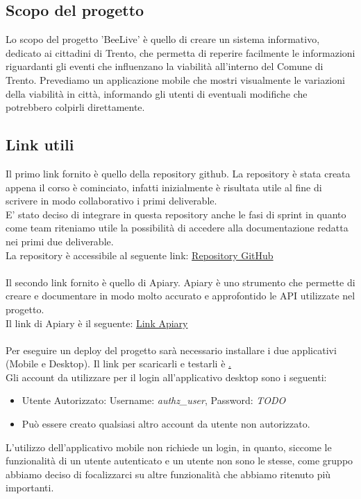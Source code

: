\documentclass{article}
\begin{document}
\subsection{Scopo del progetto}

Lo scopo del progetto 'BeeLive' è quello di creare un sistema informativo, dedicato ai cittadini di Trento, che permetta di reperire facilmente le informazioni riguardanti gli eventi che influenzano la viabilità all'interno del Comune di Trento. Prevediamo un applicazione mobile che mostri visualmente le variazioni della viabilità in città, informando gli utenti di eventuali modifiche che potrebbero colpirli direttamente. 

\subsection{Link utili}
Il primo link fornito è quello della repository github. La repository è stata creata appena il corso è cominciato, infatti inizialmente è risultata utile al fine di scrivere in modo collaborativo i primi deliverable.\\
E' stato deciso di integrare in questa repository anche le fasi di sprint in quanto come team riteniamo utile la possibilità di accedere alla documentazione redatta nei primi due deliverable.\\
La repository è accessibile al seguente link: \href{https://github.com/ELI20ZIVI/BeeLive/}{Repository GitHub}\\ \\
Il secondo link fornito è quello di Apiary. Apiary è uno strumento che permette di creare e documentare in modo molto accurato e approfontido le API utilizzate nel progetto.\\
Il link di Apiary è il seguente: \href{https://beelive.docs.apiary.io/#}{Link Apiary}\\ \\
Per eseguire un deploy del progetto sarà necessario installare i due applicativi (Mobile e Desktop). Il link per scaricarli e testarli è \href{github-release-page}.\\
Gli account da utilizzare per il login all'applicativo desktop sono i seguenti:
\begin{itemize}
    \item Utente Autorizzato: Username: \textit{authz\_user}, Password: \textit{TODO}
    \item Può essere creato qualsiasi altro account da utente non autorizzato.
\end{itemize}
L'utilizzo dell'applicativo mobile non richiede un login, in quanto, siccome le funzionalità di un utente autenticato e un utente non sono le stesse, come gruppo abbiamo deciso di focalizzarci su altre funzionalità che abbiamo ritenuto più importanti.
\end{document}
